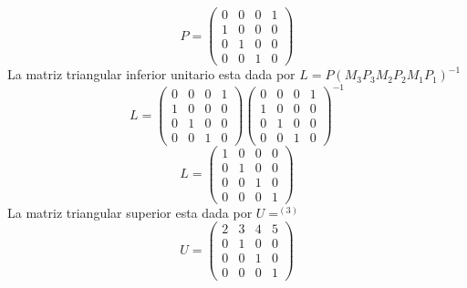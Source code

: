 \[ P =
    \left( \begin{array}{cccc}
    0 & 0 & 0 & 1\\ 
    1 & 0 & 0 & 0\\ 
    0 & 1 & 0 & 0\\
    0 & 0 & 1 & 0
    \end{array} \right)
\]
La matriz triangular inferior unitario esta dada por $L = P(M_{3}P_{3}M_{2}P_{2}M_{1}P_{1})^{-1}$
\[ L =
    \left( \begin{array}{cccc}
    0 & 0 & 0 & 1\\ 
    1 & 0 & 0 & 0\\ 
    0 & 1 & 0 & 0\\
    0 & 0 & 1 & 0
    \end{array} \right)
    \left( \begin{array}{cccc}
    0 & 0 & 0 & 1\\
    1 & 0 & 0 & 0\\ 
    0 & 1 & 0 & 0\\ 
    0 & 0 & 1 & 0
    \end{array} \right)^{-1}
\]
\[ L =
    \left( \begin{array}{cccc}
    1 & 0 & 0 & 0\\
    0 & 1 & 0 & 0\\ 
    0 & 0 & 1 & 0\\ 
    0 & 0 & 0 & 1
    \end{array} \right)
\]
La matriz triangular superior esta dada por  $U = ^{(3)}$
\[ U =
    \left( \begin{array}{cccc}
    2 & 3 & 4 & 5\\
    0 & 1 & 0 & 0\\
    0 & 0 & 1 & 0\\
    0 & 0 & 0 & 1
    \end{array} \right)
\]

